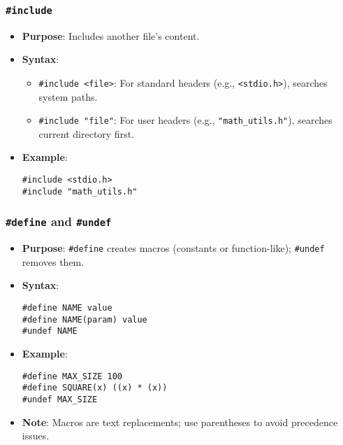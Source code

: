 \documentclass[a4paper,12pt]{article}
\begin{document}
\subsubsection{\texttt{\#include}}
\begin{itemize}[noitemsep]
    \item \textbf{Purpose}: Includes another file’s content.
    \item \textbf{Syntax}:
    \begin{itemize}
        \item \texttt{\#include <file>}: For standard headers (e.g., \texttt{<stdio.h>}), searches system paths.
        \item \texttt{\#include "file"}: For user headers (e.g., \texttt{"math\_utils.h"}), searches current directory first.
    \end{itemize}
    \item \textbf{Example}:
    
\begin{lstlisting}[caption=Header File referencing/usage]
#include <stdio.h>
#include "math_utils.h"
\end{lstlisting}
    
\end{itemize}

\subsubsection{\texttt{\#define} and \texttt{\#undef}}
\begin{itemize}[noitemsep]
    \item \textbf{Purpose}: \texttt{\#define} creates macros (constants or function-like); \texttt{\#undef} removes them.
    \item \textbf{Syntax}:
\begin{lstlisting}[caption=Preprocessor Define]
#define NAME value
#define NAME(param) value
#undef NAME
    \end{lstlisting}
    
    \item \textbf{Example}:
    
\begin{lstlisting}[caption=\#define Example]
#define MAX_SIZE 100
#define SQUARE(x) ((x) * (x))
#undef MAX_SIZE
\end{lstlisting}


    \item \textbf{Note}: Macros are text replacements; use parentheses to avoid precedence issues.
\end{itemize}
\end{document}
